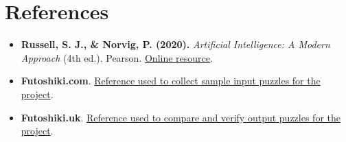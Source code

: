 \section{References}

\begin{itemize}
	\item \textbf{Russell, S. J., \& Norvig, P. (2020).} \textit{Artificial Intelligence: A Modern Approach} (4th ed.). Pearson. \href{https://aima.cs.berkeley.edu/}{Online resource}.
	\item \textbf{Futoshiki.com}. \href{https://www.futoshiki.com/}{Reference used to collect sample input puzzles for the project}.
	\item \textbf{Futoshiki.uk}. \href{https://futoshiki.uk/index.html}{Reference used to compare and verify output puzzles for the project}.
\end{itemize}